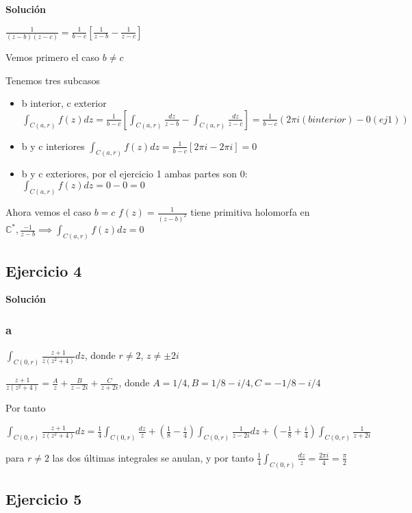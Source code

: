 \textbf{Solución}

$\frac{1}{(z-b)(z-c)} = \frac{1}{b-c} [\frac{1}{z-b}-\frac{1}{z-c}]$

Vemos primero el caso $b\not = c$

Tenemos tres subcasos
\begin{itemize}
	\item b interior, c exterior $\int_{C(a,r)} f(z)dz = \frac{1}{b-c} [ \int_{C(a,r)} \frac{dz}{z-b} - \int_{C(a,r)} \frac{dz}{z-c} ] = \frac{1}{b-c} (2\pi i (b interior) - 0 (ej1))$
	
	\item b y c interiores $\int_{C(a,r)} f(z)dz =  \frac{1}{b-c}[2\pi i - 2\pi i] = 0$
	
	\item b y c exteriores, por el ejercicio 1 ambas partes son $0$: $\int_{C(a,r)} f(z)dz = 0-0 = 0$
\end{itemize}

Ahora vemos el caso $b=c$
$f(z) = \frac{1}{(z-b)^2}$ tiene primitiva holomorfa en $\mathbb{C}^{\ast}, \frac{-1}{z-b} \implies \int_{C(a,r)} f(z)dz = 0 $


\subsection{Ejercicio 4}

\textbf{Solución}
\subsubsection{a}

$\int_{C(0,r)} \frac{z+1}{z(z^2+4)} dz$, donde $r\not = 2$, $z\not = \pm 2i$

$\frac{z+1}{z(z^2+4)} = \frac{A}{z} + \frac{B}{z-2i} + \frac{C}{z+2i}$, donde $A = 1/4, B=1/8-i/4, C = -1/8-i/4$

Por tanto

$\int_{C(0,r)} \frac{z+1}{z(z^2+4)} dz = \frac{1}{4} \int_{C(0,r)} \frac{dz}{z} + (\frac{1}{8}-\frac{i}{4})\int_{C(0,r)} \frac{1}{z-2i}dz + (-\frac{1}{8}+\frac{i}{4}) \int_{C(0,r)} \frac{1}{z+2i}$

para $r\not = 2$ las dos últimas integrales se anulan, y por tanto $\frac{1}{4}\int_{C(0,r)} \frac{dz}{z} = \frac{2\pi i}{4} = \frac{\pi}{2}$



\subsection{Ejercicio 5}

